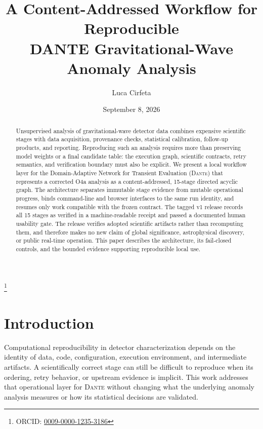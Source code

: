 \documentclass[aps,prd,twocolumn,superscriptaddress,nofootinbib,amsmath,amssymb,floatfix,10pt]{revtex4-2}
\newcommand{\dante}{\textsc{Dante}}
\begin{document}
\title{\texorpdfstring{A Content-Addressed Workflow for Reproducible\\
DANTE Gravitational-Wave Anomaly Analysis}{A Content-Addressed Workflow for
Reproducible DANTE Gravitational-Wave Anomaly Analysis}}

\author{Luca Cirfeta}
\thanks{ORCID: \href{https://orcid.org/0009-0000-1235-3186}{0009-0000-1235-3186}}
\date{September 8, 2026}

\begin{abstract}
Unsupervised analysis of gravitational-wave detector data combines expensive
scientific stages with data acquisition, provenance checks, statistical
calibration, follow-up products, and reporting.  Reproducing such an analysis
requires more than preserving model weights or a final candidate table: the
execution graph, scientific contracts, retry semantics, and verification
boundary must also be explicit.  We present a local workflow layer for the
Domain-Adaptive Network for Transient Evaluation (\dante{}) that represents a
corrected O4a analysis as a content-addressed, 15-stage directed acyclic graph.
The architecture separates immutable stage evidence from mutable operational
progress, binds command-line and browser interfaces to the same run identity,
and resumes only work compatible with the frozen contract.  The tagged v1
release records all 15 stages as verified in a machine-readable receipt and
passed a documented human usability gate.  The release verifies adopted
scientific artifacts rather than recomputing them, and therefore makes no new
claim of global significance, astrophysical discovery, or public real-time
operation.  This paper describes the architecture, its fail-closed controls,
and the bounded evidence supporting reproducible local use.
\end{abstract}

\maketitle

\section{Introduction}
\label{sec:introduction}

Computational reproducibility in detector characterization depends on the
identity of data, code, configuration, execution environment, and intermediate
artifacts.  A scientifically correct stage can still be difficult to reproduce
when its ordering, retry behavior, or upstream evidence is implicit.  This work
addresses that operational layer for \dante{} without changing what the
underlying anomaly analysis measures or how its statistical decisions are
validated.
\end{document}
